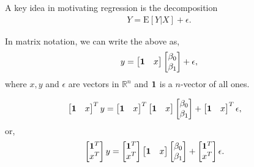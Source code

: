 \documentclass{amsart}
\theoremstyle{plain}
\numberwithin{equation}{section}
\begin{document}
A key idea in motivating regression is the decomposition
\begin{align*}
Y = \mathrm{E}[Y|X] + \epsilon.
\end{align*}

In matrix notation, we can write the above as,
\begin{align*}
y = \begin{bmatrix}
{\bf 1} & x
\end{bmatrix}
\begin{bmatrix}
\beta_0\\
\beta_1
\end{bmatrix} + \epsilon,
\end{align*}
where $x, y$ and $\epsilon$ are vectors in $\mathbb{R}^n$ and 
${\bf 1}$ is a $n$-vector of all ones.

\begin{align*}
\begin{bmatrix}
{\bf 1} & x
\end{bmatrix}^T
y &= 
\begin{bmatrix}
{\bf 1} & x
\end{bmatrix}^T
\begin{bmatrix}
{\bf 1} & x
\end{bmatrix}
\begin{bmatrix}
\beta_0\\
\beta_1
\end{bmatrix} + 
\begin{bmatrix}
{\bf 1} & x
\end{bmatrix}^T\epsilon,
\end{align*}
or,
\begin{align*}
\begin{bmatrix}
{\bf 1}^T\\
x^T
\end{bmatrix}
y &= 
\begin{bmatrix}
{\bf 1}^T\\
x^T
\end{bmatrix}
\begin{bmatrix}
{\bf 1} & x
\end{bmatrix}
\begin{bmatrix}
\beta_0\\
\beta_1
\end{bmatrix} + 
\begin{bmatrix}
{\bf 1}^T\\
x^T
\end{bmatrix}\epsilon.
\end{align*}
\end{document}
